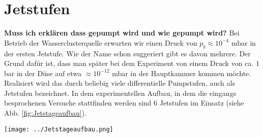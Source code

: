 \section{Jetstufen}

\textbf{Muss ich erklären dass gepumpt wird und wie gepumpt wird?}
Bei Betrieb der Wasserclusterquelle erwarten wir einen Druck von $p_b \approx 10^{-4}$ mbar in der ersten Jetstufe. Wie der Name schon suggeriert gibt es davon mehrere. Der Grund dafür ist, dass man später bei dem Experiment von einem Druck von ca. 1 bar in der Düse auf etwa $\approx 10^{-12}$ mbar in der Hauptkammer kommen möchte. Realisiert wird das durch beliebig viele differentielle Pumpstufen, auch als Jetstufen bezeichnet. In dem experimentellen Aufbau, in dem die eingangs besprochenen Versuche stattfinden werden sind 6 Jetstufen im Einsatz (siehe Abb. \ref{fig:Jetstageaufbau}).

\begin{center}
\begin{minipage}{\linewidth}
\centering
\texttt{[image: ../Jetstageaufbau.png]}%
 \label{fig:Jetstageaufbau}
\end{minipage} 
\end{center} 

